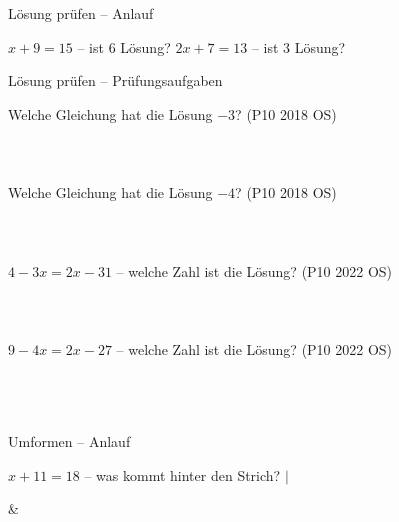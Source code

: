\setcounter{aufgabe}{64}

\begin{aufgabe}{Lösung prüfen – Anlauf}
\begin{teile}
\teil $x + 9 = 15$ – ist $6$ Lösung?
\teil $2x + 7 = 13$ – ist $3$ Lösung?
\end{teile}
\end{aufgabe}

\begin{aufgabe}{Lösung prüfen – Prüfungsaufgaben}
\begin{teile}
\teil Welche Gleichung hat die Lösung $-3$? \hfill (P10 2018 OS) \\  \\  \\  \\ 
\teil Welche Gleichung hat die Lösung $-4$? \hfill (P10 2018 OS) \\  \\  \\  \\ 
\teil $4 - 3x = 2x - 31$ – welche Zahl ist die Lösung? \hfill (P10 2022 OS) \\  \\  \\  \\ 
\teil $9 - 4x = 2x - 27$ – welche Zahl ist die Lösung? \hfill (P10 2022 OS) \\  \\  \\  \\ 
\end{teile}
\end{aufgabe}

\begin{aufgabe}{Umformen – Anlauf}
\begin{teile}
\teil $x + 11 = 18$ – was kommt hinter den Strich? $\mid$ \leerfeld
\end{teile}
\begin{gleichungsraster}[2]
 &
 \\
\end{gleichungsraster}
\end{aufgabe}

